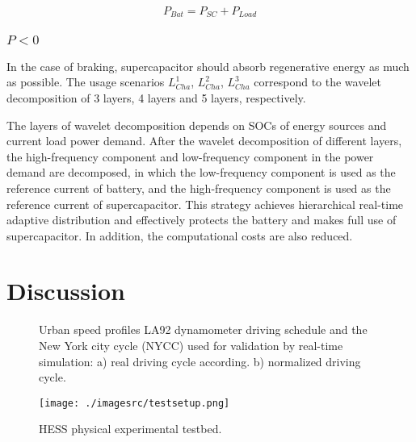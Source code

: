 \documentclass[energies,article,submit,moreauthors,pdftex,10pt,a4paper]{Definitions/mdpi}
\begin{document}
\begin{equation}
{P_{Bat}} = {P_{SC}} + {P_{Load}}
\end{equation}


\subsubsection{${P<0}$}
In the case of braking, supercapacitor should absorb regenerative energy as much as possible.
The usage scenarios $ L_{Cha}^1$, $ L_{Cha}^2$, $ L_{Cha}^3$ correspond to the wavelet decomposition of 3 layers, 4 layers and 5 layers, respectively.

The layers of wavelet decomposition depends on SOCs of energy sources and current load power demand. After the wavelet decomposition of different layers, the high-frequency component and low-frequency component in the power demand are decomposed, in which the low-frequency component is used as the reference current of battery, and the high-frequency component is used as the reference current of supercapacitor.
This strategy achieves hierarchical real-time adaptive distribution and effectively protects the battery and makes full use of supercapacitor.
In addition, the computational costs are also reduced.

\section{Discussion}

\begin{figure}[ht]
\centering  %
\caption{Urban speed profiles LA92 dynamometer driving schedule and the New York city cycle (NYCC) used for validation by real-time simulation: a) real driving
cycle according. b) normalized driving cycle.}
\label{test}
\end{figure}

\begin{figure}[ht]
\centering
\texttt{[image: ./imagesrc/testsetup.png]}
\caption{HESS physical experimental testbed.}
\label{testsetup}
\end{figure}
\end{document}
